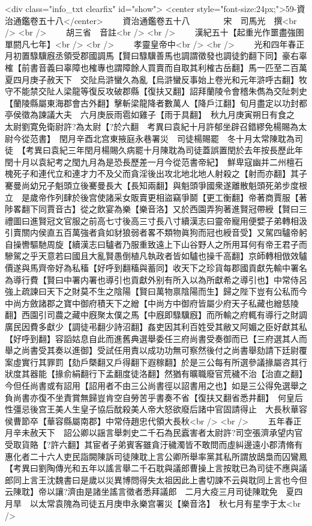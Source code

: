 <div class="info_txt clearfix" id="show">
<center style="font-size:24px;">59-資治通鑑卷五十八</center>
  　　資治通鑑卷五十八　　　　宋　司馬光　撰<br />
<br />
　　胡三省　音註<br />
<br />
　　漢紀五十【起重光作噩盡強圉單閼凡七年】<br />
<br />
　　孝靈皇帝中<br />
<br />
　　光和四年春正月初置騄驥廐丞領受郡國調馬【賢曰騄驥善馬也調謂徵發也調徒釣翻下同】豪右辜榷【前書音義曰辜障也榷專也謂障餘人買賣而自取其利榷古岳翻】馬一匹至二百萬　夏四月庚子赦天下　交阯烏滸蠻久為亂【烏滸蠻反事始上卷光和元年滸呼古翻】牧守不能禁交阯人梁龍等復反攻破郡縣【復扶又翻】詔拜蘭陵令會稽朱儁為交阯刺史【蘭陵縣屬東海郡會古外翻】擊斬梁龍降者數萬人【降戶江翻】旬月盡定以功封都亭侯徵為諫議大夫　六月庚辰雨雹如雞子【雨于具翻】　秋九月庚寅朔日有食之　太尉劉寛免衛尉許?為太尉【?於六翻　考異曰袁紀十月許郁坐辟召錯繆免楊賜為太尉今從范書】　閏月辛酉北宫東掖庭永巷署災　司徒楊賜罷　冬十月太常陳耽為司徒　【考異曰袁紀三年閏月楊賜久病罷十月陳耽為司徒蓋誤置閏於去年按長歷此年閏十月以袁紀考之閠九月為是恐長歷差一月今從范書帝紀】　鮮卑寇幽并二州檀石槐死子和連代立和連才力不及父而貪淫後出攻北地北地人射殺之【射而亦翻】其子騫曼尚幼兄子魁頭立後騫曼長大【長知兩翻】與魁頭爭國衆遂離散魁頭死弟步度根立　是歲帝作列肆於後宫使諸采女販賣更相盜竊爭鬬【更工衡翻】帝著商賈服【著陟畧翻下同賈音古】從之飲宴為樂【樂音洛】又於西園弄狗著進賢冠帶綬【賢曰三禮圖曰進賢冠文官服之前高七寸後高三寸長八寸續漢志曰靈帝寵用便嬖子弟轉相汲引賣關内侯直五百萬強者貪如豺狼弱者畧不類物眞狗而冠也綬音受】又駕四驢帝躬自操轡驅馳周旋【續漢志曰驢者乃服重致遠上下山谷野人之所用耳何有帝王君子而驂駕之乎天意若曰國且大亂賢愚倒植凡執政者皆如驢也操千高翻】京師轉相倣效驢價遂與馬齊帝好為私稸【好呼到翻稸與蓄同】收天下之珍貨每郡國貢獻先輸中署名為導行費【賢曰中署内署也導引也貢獻外别有所入以為所獻希之導引也】中常侍呂強上疏諫曰天下之財莫不生之陰陽【賢曰萬物禀陰陽而生】歸之陛下豈有公私而今中尚方斂諸郡之寶中御府積天下之繒【中尚方中御府皆屬少府天子私藏也繒慈陵翻】西園引司農之藏中廐聚太僕之馬【中廐即騄驥廐】而所輸之府輒有導行之財調廣民因費多獻少【調徒弔翻少詩沼翻】姦吏因其利百姓受其敝又阿媚之臣好獻其私【好呼到翻】容謟姑息自此而進舊典選舉委任三府尚書受奏御而已【三府選其人而舉之尚書受其奏以進御】受試任用責以成功功無可察然後付之尚書舉劾請下廷尉覆案虛實行其罪罰【劾戶槩翻又戶得翻下遐稼翻】於是三公每有所選參議掾屬咨其行狀度其器能【掾俞絹翻行下孟翻度徒洛翻】然猶有曠職廢官荒穢不治【治直之翻】今但任尚書或有詔用【詔用者不由三公尚書徑以詔書用之也】如是三公得免選舉之負尚書亦復不坐責賞無歸豈肯空自勞苦乎書奏不省【復扶又翻省悉井翻】　何皇后性彊忌後宫王美人生皇子協后酖殺美人帝大怒欲廢后諸中官固請得止　大長秋華容侯曹節卒【華容縣屬南郡】中常侍趙忠代領大長秋<br />
<br />
　　五年春正月辛未赦天下　詔公卿以謡言舉刺史二千石為民蠧害者太尉許?司空張濟承望内官受取貨賂【?許六翻】其宦者子弟賓客雖貪汙穢濁皆不敢問而虛糾邊遠小郡清脩有惠化者二十六人吏民詣闕陳訴司徒陳耽上言公卿所舉率黨其私所謂放鴟梟而囚鸞鳳　【考異曰劉陶傳光和五年以謠言舉二千石耽與議郎曹操上言按耽已為司徒不應與議郎同上言王沈魏書曰是歲以災異博問得失太祖因此上書切諫不云與耽同上言也今但云陳耽】帝以讓?濟由是諸坐謠言徵者悉拜議郎　二月大疫三月司徒陳耽免　夏四月旱　以太常袁隗為司徒五月庚申永樂宫署災【樂音洛】　秋七月有星孛于太<br />
